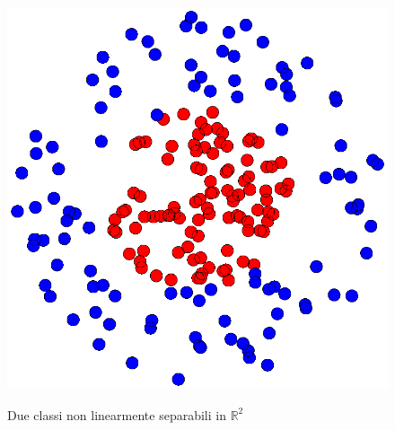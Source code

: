 \begin{figure}[H] %
 	\centering	
	
	\fboxsep=0mm%
	\fboxrule=1mm%

	 {
		\includegraphics[scale=0.9]{img/circular.eps}		
	}	
	\caption{Due classi non linearmente separabili in $\mathbb{R}^2$}
\end{figure}
